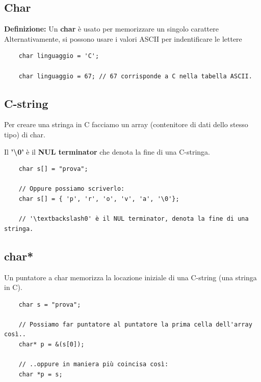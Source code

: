
\subsection{Char}

\textsf{\small \textbf{Definizione: } Un \textbf{char} è usato per memorizzare un singolo carattere} \\

\textsf{\small Alternativamente, si possono usare i valori ASCII per indentificare le lettere} \\

\begin{lstlisting}
	char linguaggio = 'C';
	
	char linguaggio = 67; // 67 corrisponde a C nella tabella ASCII.
\end{lstlisting}

\subsection{C-string}

\textsf{\small Per creare una stringa in C facciamo un array (contenitore di dati dello stesso tipo) di char.}

\textsf{\small Il \textbf{'\textbackslash0'} è il \textbf{NUL terminator} che denota la fine di una C-stringa. } \\

\begin{lstlisting}
	char s[] = "prova";
	
	// Oppure possiamo scriverlo:
	char s[] = { 'p', 'r', 'o', 'v', 'a', '\0'};
	
	// '\textbackslash0' è il NUL terminator, denota la fine di una stringa.
\end{lstlisting}

\subsection{char*}

\textsf{\small Un puntatore a char memorizza la locazione iniziale di una C-string (una stringa in C). } \\

\begin{lstlisting}
	char s = "prova";
	
	// Possiamo far puntatore al puntatore la prima cella dell'array così..
	char* p = &(s[0]);
	
	// ..oppure in maniera più coincisa così:
	char *p = s;
\end{lstlisting}

